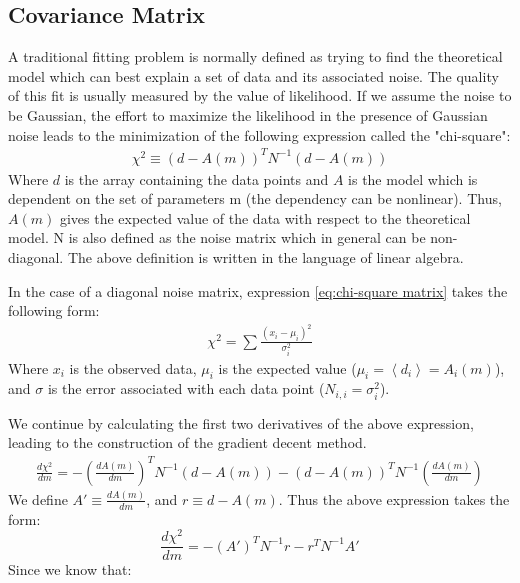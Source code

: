 \documentclass[12pt, TexShade, letterpaper]{report}
\begin{document}
\subsection{Covariance Matrix}
\label{chap:method,sub:cov_mat}
A traditional fitting problem is normally defined as trying to find the theoretical model which can best explain a set of data and its associated noise. The quality of this fit is usually measured by the value of likelihood. If we assume the noise to be Gaussian, the effort to maximize the likelihood in the presence of Gaussian noise leads to the minimization of the following expression called the "chi-square":
\begin{gather}
    \chi^2 \equiv \left (d-A\left(m\right)\right)^T N^{-1} \left(d-A\left(m\right)\right) 
    \label{eq:chi-square matrix}
\end{gather}
Where $d$ is the array containing the data points and $A$ is the model which is dependent on the set of parameters m (the dependency can be nonlinear). Thus, $A(m)$ gives the expected value of the data with respect to the theoretical model. N is also defined as the noise matrix which in general can be non-diagonal. The above definition is written in the language of linear algebra.\par
In the case of a diagonal noise matrix, expression \ref{eq:chi-square matrix} takes the following form:
\begin{gather}
    \chi^2 = \sum \frac {\left(x_i - \mu_i\right)^2}{\sigma^2_{i}}
    \label{eq: chi-sqaure simple}
\end{gather}
Where $x_i$ is the observed data, $\mu_i$ is the expected value ($\mu_i=\left<d_i\right>=A_i\left(m\right)$), and $\sigma$ is the error associated with each data point ($N_{i, i} = \sigma^2_{i}$). \par
We continue by calculating the first two derivatives of the above expression, leading to the construction of the gradient decent method.
\begin{gather}
        \frac{d \chi^2}{dm} = - \left(\frac{dA\left(m\right)}{dm}\right)^T N^{-1} (d-A(m)) - \left(d-A\left(m\right)\right)^T N^{-1} \left(\frac{dA(m)}{dm}\right ) 
\end{gather}
We define $A' \equiv\frac{dA(m)}{dm}$, and $r \equiv d - A(m)$. Thus the above expression takes the form:
\begin{equation}
    \frac{d \chi^2}{dm} = - \left(A'\right)^T N^{-1} r - r^T N^{-1} A'
    \label{eq:csq_first_deriv}
\end{equation}
Since we know that:
\end{document}
